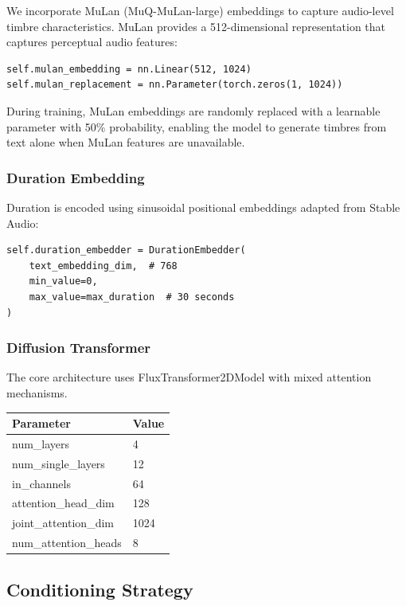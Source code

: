\documentclass[11pt,a4paper]{article}
\begin{document}
We incorporate MuLan (MuQ-MuLan-large) embeddings to capture audio-level timbre characteristics. MuLan provides a 512-dimensional representation that captures perceptual audio features:

\begin{verbatim}
self.mulan_embedding = nn.Linear(512, 1024)
self.mulan_replacement = nn.Parameter(torch.zeros(1, 1024))
\end{verbatim}

During training, MuLan embeddings are randomly replaced with a learnable parameter with 50\% probability, enabling the model to generate timbres from text alone when MuLan features are unavailable.

\subsubsection{Duration Embedding}

Duration is encoded using sinusoidal positional embeddings adapted from Stable Audio:

\begin{verbatim}
self.duration_embedder = DurationEmbedder(
    text_embedding_dim,  # 768
    min_value=0,
    max_value=max_duration  # 30 seconds
)
\end{verbatim}

\subsubsection{Diffusion Transformer}

The core architecture uses FluxTransformer2DModel with mixed attention mechanisms.

\begin{table}[h]
\centering
\begin{tabular}{ll}
\toprule
\textbf{Parameter} & \textbf{Value} \\
\midrule
num\_layers & 4 \\
num\_single\_layers & 12 \\
in\_channels & 64 \\
attention\_head\_dim & 128 \\
joint\_attention\_dim & 1024 \\
num\_attention\_heads & 8 \\
\bottomrule
\end{tabular}
\end{table}

\subsection{Conditioning Strategy}
\end{document}

